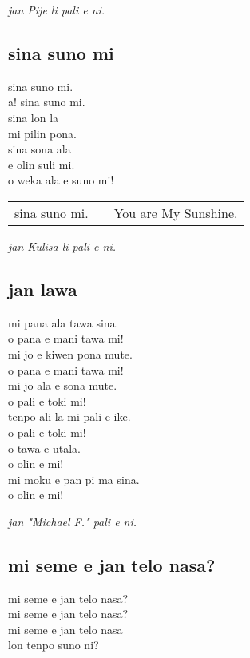 \textit{jan Pije li pali e ni. \cite{www:Pije:01}}
%
\subsection{sina suno mi}

sina suno mi. \\
a! sina suno mi. \\
sina lon la \\
mi pilin pona. \\
sina sona ala \\
e olin suli mi. \\
o weka ala e suno mi!

\begin{supertabular}{p{5,5cm}|ll}
    sina suno mi. &  & You are My Sunshine. \\
\end{supertabular}

\textit{jan Kulisa li pali e ni. \cite{www:janKluisa:01}}
%
\subsection{jan lawa}

mi pana ala tawa sina. \\
o pana e mani tawa mi! \\
mi jo e kiwen pona mute. \\
o pana e mani tawa mi! \\
mi jo ala e sona mute. \\
o pali e toki mi!  \\
tenpo ali la mi pali e ike. \\
o pali e toki mi! \\
o tawa e utala. \\
o olin e mi! \\
mi moku e pan pi ma sina. \\
o olin e mi!

\textit{jan "Michael F." pali e ni. \cite{www:failbluedot:01}}

\subsection{mi seme e jan telo nasa?}

mi seme e jan telo nasa? \\
mi seme e jan telo nasa? \\
mi seme e jan telo nasa \\
lon tenpo suno ni?

